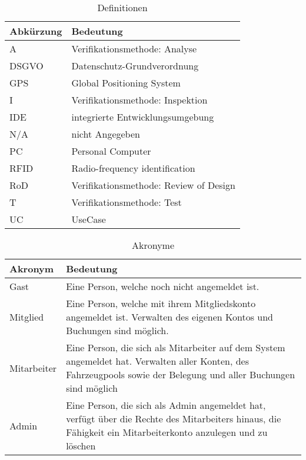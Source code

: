 \begin{table} [H]
    \centering
    \caption{Definitionen}
    \begin{tabularx}{\textwidth}{|l|X|}
        \toprule
        \textbf{Abkürzung} & \textbf{Bedeutung} \\
        \hline
        A & Verifikationsmethode: Analyse \\
        \hline
        DSGVO & Datenschutz-Grundverordnung\\
        \hline
        GPS & Global Positioning System \\
        \hline
        I & Verifikationsmethode: Inspektion\\
        \hline
        IDE & integrierte Entwicklungsumgebung \\
        \hline
        N/A & nicht Angegeben \\
        \hline
        PC & Personal Computer \\
        \hline
        RFID & Radio-frequency identification \\
        \hline
        RoD & Verifikationsmethode: Review of Design\\
        \hline
        T & Verifikationsmethode: Test\\
        \hline
        UC & UseCase \\
        \bottomrule
    \end{tabularx}\label{tab:Definitionen}
\end{table}

\begin{table} [H]
    \centering
    \caption{Akronyme}
    \begin{tabularx}{\textwidth}{|l|X|}
        \toprule
        \textbf{Akronym} & \textbf{Bedeutung} \\
        \hline
        Gast & Eine Person, welche noch nicht angemeldet ist.\\
        \hline
        Mitglied & Eine Person, welche mit ihrem Mitgliedskonto angemeldet ist.
        Verwalten des eigenen Kontos und Buchungen sind möglich. \\
        \hline
        Mitarbeiter & Eine Person, die sich als Mitarbeiter auf dem System angemeldet hat.
        Verwalten aller Konten, des Fahrzeugpools sowie der Belegung und aller Buchungen sind möglich \\
        \hline
        Admin & Eine Person, die sich als Admin angemeldet hat, verfügt über die Rechte des Mitarbeiters hinaus, die Fähigkeit ein Mitarbeiterkonto anzulegen und zu löschen    \\
        \bottomrule
    \end{tabularx}\label{tab:Akronyme}
\end{table}